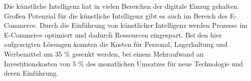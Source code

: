 Die künstliche Intelligenz hat in vielen Bereichen der digitale Einzug gehalten. Großen Potenzial für die künstliche Intelligenz gibt es auch im Bereich des E-Commerce. Durch die Einführung von künstlicher Intelligenz werden Prozesse im E-Commerce optimiert und dadurch Ressourcen eingespart. Bei den hier aufgezeigten Lösungen konnten die Kosten für Personal, Lagerhaltung und Werbemittel um 35 \% gesenkt werden, bei einem Mehraufwand an Investitionskosten von 5 \% des monatlichen Umsatzes für neue Technologie und deren Einführung.